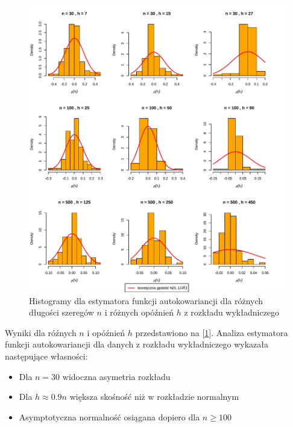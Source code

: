 \documentclass[10pt, a4paper]{article}\usepackage[]{graphicx}\usepackage[]{xcolor}
\makeatletter
\def\maxwidth{ %
  \ifdim\Gin@nat@width>\linewidth
    \linewidth
  \else
    \Gin@nat@width
  \fi
}
\newenvironment{knitrout}{}{} %
\makeatother
\begin{document}
\begin{knitrout}
\color{fgcolor}\begin{figure}[H]

{\centering \includegraphics[width=\maxwidth]{figure/wykresy-gamma-exp-1} 

}

\caption[Histogramy dla estymatora funkcji autokowariancji dla różnych długości szeregów $n$ i różnych opóźnień $h$ z rozkładu wykładniczego]{Histogramy dla estymatora funkcji autokowariancji dla różnych długości szeregów $n$ i różnych opóźnień $h$ z rozkładu wykładniczego}\label{fig:wykresy-gamma-exp}
\end{figure}

\end{knitrout}

Wyniki dla róźnych $n$ i opóźnień $h$ przedstawiono na [\ref{fig:wykresy-gamma-exp}]. Analiza estymatora funkcji autokowariancji dla danych z rozkładu wykładniczego wykazała następujące własności:
  \begin{itemize}
  \item Dla $n=30$ widoczna asymetria rozkładu
  \item Dla $h \approx 0.9n$ większa skośność niż w rozkładzie normalnym
  \item Asymptotyczna normalność osiągana dopiero dla $n \geq 100$
\end{itemize}
\end{document}
